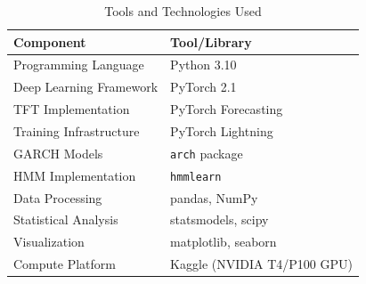 \begin{table}[h!]
\caption{Tools and Technologies Used}
\label{tab:tools}
\centering
\begin{tabular}{ll}
\hline
\textbf{Component} & \textbf{Tool/Library} \\
\hline
Programming Language & Python 3.10 \\
Deep Learning Framework & PyTorch 2.1 \\
TFT Implementation & PyTorch Forecasting \\
Training Infrastructure & PyTorch Lightning \\
GARCH Models & \texttt{arch} package \\
HMM Implementation & \texttt{hmmlearn} \\
Data Processing & pandas, NumPy \\
Statistical Analysis & statsmodels, scipy \\
Visualization & matplotlib, seaborn \\
Compute Platform & Kaggle (NVIDIA T4/P100 GPU) \\
\hline
\end{tabular}
\end{table}
